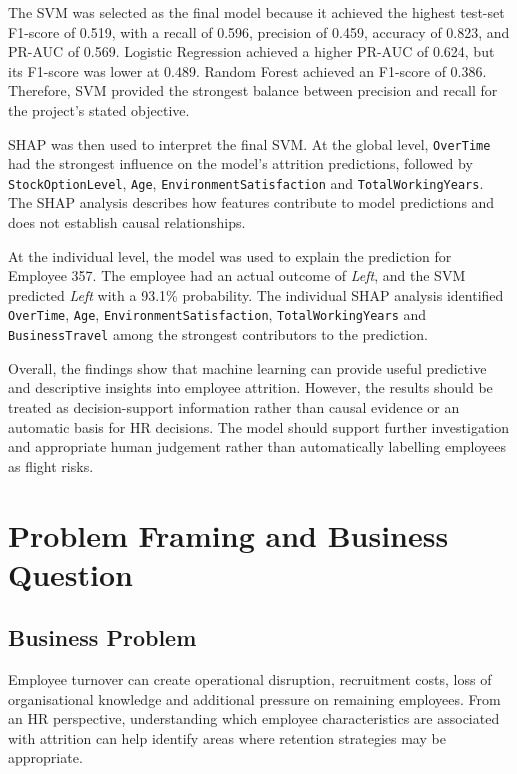 \documentclass[11pt]{article}
\begin{document}
The SVM was selected as the final model because it achieved the highest test-set F1-score of 0.519, with a recall of 0.596, precision of 0.459, accuracy of 0.823, and PR-AUC of 0.569. Logistic Regression achieved a higher PR-AUC of 0.624, but its F1-score was lower at 0.489. Random Forest achieved an F1-score of 0.386. Therefore, SVM provided the strongest balance between precision and recall for the project's stated objective.

SHAP was then used to interpret the final SVM. At the global level, \texttt{OverTime} had the strongest influence on the model's attrition predictions, followed by \texttt{StockOptionLevel}, \texttt{Age}, \texttt{EnvironmentSatisfaction} and \texttt{TotalWorkingYears}. The SHAP analysis describes how features contribute to model predictions and does not establish causal relationships.

At the individual level, the model was used to explain the prediction for Employee 357. The employee had an actual outcome of \textit{Left}, and the SVM predicted \textit{Left} with a 93.1\% probability. The individual SHAP analysis identified \texttt{OverTime}, \texttt{Age}, \texttt{EnvironmentSatisfaction}, \texttt{TotalWorkingYears} and \texttt{BusinessTravel} among the strongest contributors to the prediction.

Overall, the findings show that machine learning can provide useful predictive and descriptive insights into employee attrition. However, the results should be treated as decision-support information rather than causal evidence or an automatic basis for HR decisions. The model should support further investigation and appropriate human judgement rather than automatically labelling employees as flight risks.

\section{Problem Framing and Business Question}

\subsection{Business Problem}

Employee turnover can create operational disruption, recruitment costs, loss of organisational knowledge and additional pressure on remaining employees. From an HR perspective, understanding which employee characteristics are associated with attrition can help identify areas where retention strategies may be appropriate.
\end{document}
